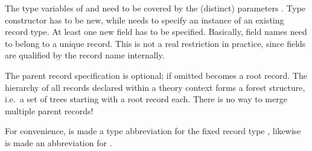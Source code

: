 \begin{isabellebody}
\begin{isamarkuptext}
\begin{description}
  The type variables of \isa{{\isachardoublequote}{\isasymtau}{\isachardoublequote}} and  need to be
  covered by the (distinct) parameters .  Type constructor  has to be new, while \isa{{\isasymtau}} needs to specify an instance of an existing record type.  At
  least one new field  has to be specified.
  Basically, field names need to belong to a unique record.  This is
  not a real restriction in practice, since fields are qualified by
  the record name internally.

  The parent record specification \isa{{\isasymtau}} is optional; if omitted
   becomes a root record.  The hierarchy of all records
  declared within a theory context forms a forest structure, i.e.\ a
  set of trees starting with a root record each.  There is no way to
  merge multiple parent records!

  For convenience,  is made a
  type abbreviation for the fixed record type , likewise is  made an abbreviation for
  .


\end{description}
\end{isamarkuptext}
\end{isabellebody}
